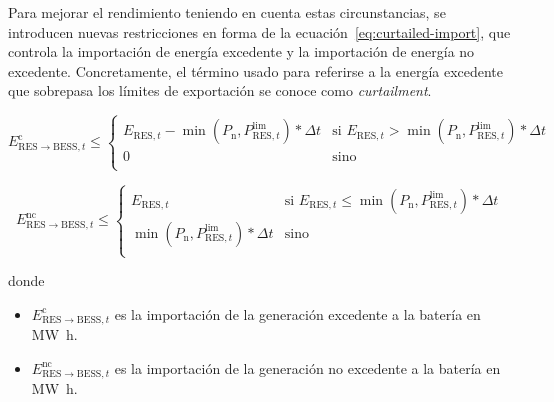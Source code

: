 Para mejorar el rendimiento teniendo en cuenta estas circunstancias, se introducen nuevas restricciones en forma de la ecuación~\ref{eq:curtailed-import}, que controla la importación de energía excedente y la importación de energía no excedente. Concretamente, el término usado para referirse a la energía excedente que sobrepasa los límites de exportación se conoce como \textit{curtailment}.

\begin{samepage}%
  \label{eq:curtailed-import}

  \begin{equation}%
    E^{\mathrm{c}}_{\mathrm{RES} \rightarrow \mathrm{BESS}, t} \le
    \begin{cases}
      E_{\mathrm{RES}, t} - \min\left(P_{\mathrm{n}}, P^{\text{lim}}_{\mathrm{RES}, t}\right) * \Delta t & \text{si } E_{\mathrm{RES}, t} > \min\left(P_{\mathrm{n}}, P^{\text{lim}}_{\mathrm{RES}, t}\right) * \Delta t \\
      0                                                                                                  & \text{sino}                                                                                                   \\
    \end{cases}
  \end{equation}

  \begin{equation}%
    E^{\mathrm{nc}}_{\mathrm{RES} \rightarrow \mathrm{BESS}, t} \le
    \begin{cases}
      E_{\mathrm{RES}, t}                                                          & \text{si } E_{\mathrm{RES}, t} \le \min\left(P_{\mathrm{n}}, P^{\text{lim}}_{\mathrm{RES}, t}\right) * \Delta t \\
      \min\left(P_{\mathrm{n}}, P^{\text{lim}}_{\mathrm{RES}, t}\right) * \Delta t & \text{sino}                                                                                                     \\
    \end{cases}
  \end{equation}

  donde

  \begin{itemize}

    \item \( E^{\mathrm{c}}_{\mathrm{RES} \rightarrow \mathrm{BESS}, t} \) es la importación de la generación excedente a la batería en \si{{\mega\watt\hour}}.

    \item \( E^{\mathrm{nc}}_{\mathrm{RES} \rightarrow \mathrm{BESS}, t} \) es la importación de la generación no excedente a la batería en \si{{\mega\watt\hour}}.

  \end{itemize}

\end{samepage}

